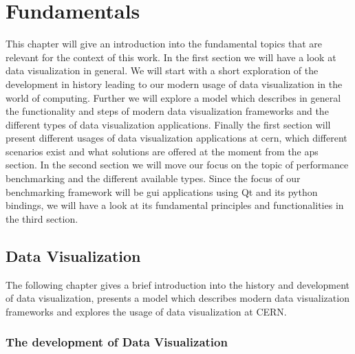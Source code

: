 
\chapter{Fundamentals}
\label{ch:fundamentals}

This chapter will give an introduction into the fundamental topics that are
relevant for the context of this work. In the first section we will have a look
at data visualization in general. We will start with a short exploration of the
development in history leading to our modern usage of data visualization in the
world of computing. Further we will explore a model which describes in general
the functionality and steps of modern data visualization frameworks and the
different types of data visualization applications. Finally the first section
will present different usages of data visualization applications at \gls{cern},
which different scenarios exist and what solutions are offered at the moment
from the \gls{aps} section. In the second section we will move our focus on the
topic of performance benchmarking and the different available types. Since the
focus of our benchmarking framework will be \gls{gui} applications using Qt and
its python bindings, we will have a look at its fundamental principles and
functionalities in the third section. 




\section{Data Visualization}
\label{sec:fundamentals:charting}

The following chapter gives a brief introduction into the history and
development of data visualization, presents a model which describes modern data
visualization frameworks and explores the usage of data visualization at CERN.



\subsection{The development of Data Visualization}
\label{sec:fundamentals:charting:history}

